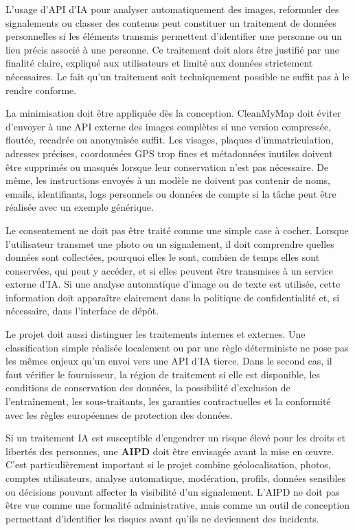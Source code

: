 \documentclass[
  10pt,
  a4paper,
  DIV=11,
  numbers=noendperiod,
  oneside]{scrreprt}
\let\oldtextbf\textbf
\renewcommand{\textbf}[1]{\oldtextbf{\textcolor{cmmnavy}{#1}}}
\begin{document}
L'usage d'API d'IA pour analyser automatiquement des images, reformuler
des signalements ou classer des contenus peut constituer un traitement
de données personnelles si les éléments transmis permettent d'identifier
une personne ou un lieu précis associé à une personne. Ce traitement
doit alors être justifié par une finalité claire, expliqué aux
utilisateurs et limité aux données strictement nécessaires. Le fait
qu'un traitement soit techniquement possible ne suffit pas à le rendre
conforme.

La minimisation doit être appliquée dès la conception. CleanMyMap doit
éviter d'envoyer à une API externe des images complètes si une version
compressée, floutée, recadrée ou anonymisée suffit. Les visages, plaques
d'immatriculation, adresses précises, coordonnées GPS trop fines et
métadonnées inutiles doivent être supprimés ou masqués lorsque leur
conservation n'est pas nécessaire. De même, les instructions envoyés à
un modèle ne doivent pas contenir de noms, emails, identifiants, logs
personnels ou données de compte si la tâche peut être réalisée avec un
exemple générique.

Le consentement ne doit pas être traité comme une simple case à cocher.
Lorsque l'utilisateur transmet une photo ou un signalement, il doit
comprendre quelles données sont collectées, pourquoi elles le sont,
combien de temps elles sont conservées, qui peut y accéder, et si elles
peuvent être transmises à un service externe d'IA. Si une analyse
automatique d'image ou de texte est utilisée, cette information doit
apparaître clairement dans la politique de confidentialité et, si
nécessaire, dans l'interface de dépôt.

Le projet doit aussi distinguer les traitements internes et externes.
Une classification simple réalisée localement ou par une règle
déterministe ne pose pas les mêmes enjeux qu'un envoi vers une API d'IA
tierce. Dans le second cas, il faut vérifier le fournisseur, la région
de traitement si elle est disponible, les conditions de conservation des
données, la possibilité d'exclusion de l'entraînement, les
sous-traitants, les garanties contractuelles et la conformité avec les
règles européennes de protection des données.

Si un traitement IA est susceptible d'engendrer un risque élevé pour les
droits et libertés des personnes, une \textbf{AIPD} doit être envisagée
avant la mise en œuvre. C'est particulièrement important si le projet
combine géolocalisation, photos, comptes utilisateurs, analyse
automatique, modération, profils, données sensibles ou décisions pouvant
affecter la visibilité d'un signalement. L'AIPD ne doit pas être vue
comme une formalité administrative, mais comme un outil de conception
permettant d'identifier les risques avant qu'ils ne deviennent des
incidents.
\end{document}
